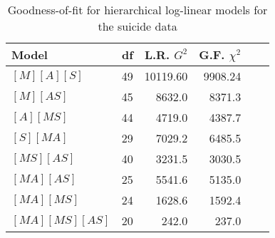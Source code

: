 \begin{table}[htb]
 \caption{Goodness-of-fit for hierarchical
log-linear models for the suicide data}\label{tab:suifit}
 \begin{center}
 \begin{tabular}{lrrrrr}
 \hline
  Model & df & L.R. \(G^2\) & G.F. \(\chi^2\) \\ 
   \hline
  $[M] [A] [S]$ & 49 & 10119.60 & 9908.24 \\ [2mm]
%
  $[M] [AS]$ & 45 & 8632.0 & 8371.3 \\ 
  $[A] [MS]$ & 44 & 4719.0 & 4387.7 \\ 
  $[S] [MA]$ & 29 & 7029.2 & 6485.5 \\ [2mm]
%
  $[MS] [AS]$ & 40 & 3231.5 & 3030.5 \\ 
  $[MA] [AS]$ & 25 & 5541.6 & 5135.0 \\ 
  $[MA] [MS]$ & 24 & 1628.6 & 1592.4 \\ [2mm]
%
  $[MA] [MS] [AS]$ & 20 & 242.0 & 237.0 \\ 
 \hline
 \end{tabular}
 \end{center}
\end{table}
